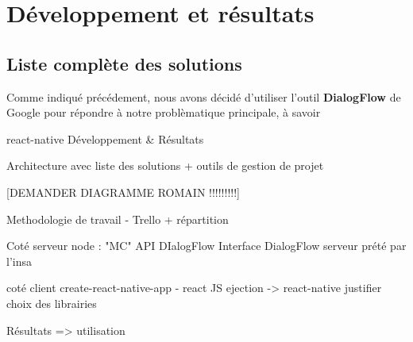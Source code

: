 \chapter{Développement et résultats}

\section{Liste complète des solutions}

Comme indiqué précédement, nous avons décidé d'utiliser l'outil \textbf{DialogFlow} de Google\cite{dialogflow} pour répondre à notre problèmatique principale, à savoir 

react-native\cite{reactnative}
Développement \& Résultats

Architecture avec liste des solutions + outils de gestion de projet

[DEMANDER DIAGRAMME ROMAIN !!!!!!!!!]

Methodologie de travail - Trello + répartition

Coté serveur 
    node : "MC"
    API DIalogFlow
    Interface DialogFlow 
    serveur prété par l'insa 

coté client 
    create-react-native-app - react JS 
    ejection -> react-native 
    justifier choix des librairies 

Résultats => utilisation 
    